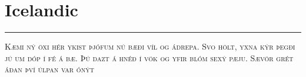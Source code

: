
\vspace{-1em}\section*{\checkno Icelandic}
\vspace{-.5em}\hrule\vspace{.5em}
\noindent\textsc{Kæmi ný öxi hér ykist þjófum nú bæði víl og ádrepa.
Svo hölt, yxna kýr þegði jú um dóp í fé á bæ. 
Þú dazt á hnéð í vök og yfir blóm sexý pæju.
Sævör grét áðan því úlpan var ónýt 
}